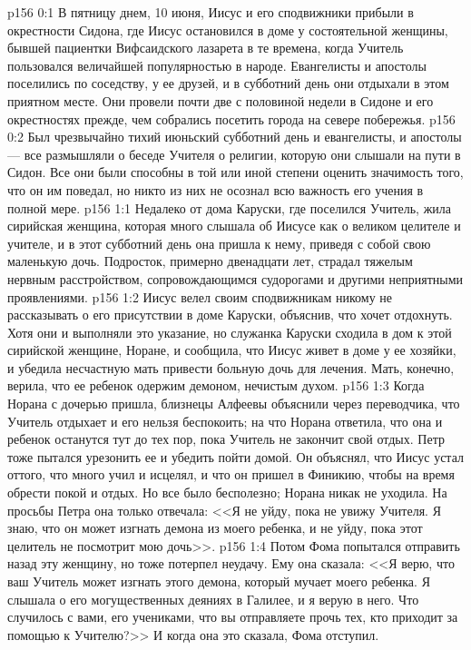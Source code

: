 \vs p156 0:1 В пятницу днем, 10 июня, Иисус и его сподвижники прибыли в окрестности Сидона, где Иисус остановился в доме у состоятельной женщины, бывшей пациентки Вифсаидского лазарета в те времена, когда Учитель пользовался величайшей популярностью в народе. Евангелисты и апостолы поселились по соседству, у ее друзей, и в субботний день они отдыхали в этом приятном месте. Они провели почти две с половиной недели в Сидоне и его окрестностях прежде, чем собрались посетить города на севере побережья.
\vs p156 0:2 Был чрезвычайно тихий июньский субботний день и евангелисты, и апостолы --- все размышляли о беседе Учителя о религии, которую они слышали на пути в Сидон. Все они были способны в той или иной степени оценить значимость того, что он им поведал, но никто из них не осознал всю важность его учения в полной мере.
\vs p156 1:1 Недалеко от дома Каруски, где поселился Учитель, жила сирийская женщина, которая много слышала об Иисусе как о великом целителе и учителе, и в этот субботний день она пришла к нему, приведя с собой свою маленькую дочь. Подросток, примерно двенадцати лет, страдал тяжелым нервным расстройством, сопровождающимся судорогами и другими неприятными проявлениями.
\vs p156 1:2 Иисус велел своим сподвижникам никому не рассказывать о его присутствии в доме Каруски, объяснив, что хочет отдохнуть. Хотя они и выполняли это указание, но служанка Каруски сходила в дом к этой сирийской женщине, Норане, и сообщила, что Иисус живет в доме у ее хозяйки, и убедила несчастную мать привести больную дочь для лечения. Мать, конечно, верила, что ее ребенок одержим демоном, нечистым духом.
\vs p156 1:3 Когда Норана с дочерью пришла, близнецы Алфеевы объяснили через переводчика, что Учитель отдыхает и его нельзя беспокоить; на что Норана ответила, что она и ребенок останутся тут до тех пор, пока Учитель не закончит свой отдых. Петр тоже пытался урезонить ее и убедить пойти домой. Он объяснял, что Иисус устал оттого, что много учил и исцелял, и что он пришел в Финикию, чтобы на время обрести покой и отдых. Но все было бесполезно; Норана никак не уходила. На просьбы Петра она только отвечала: <<Я не уйду, пока не увижу Учителя. Я знаю, что он может изгнать демона из моего ребенка, и не уйду, пока этот целитель не посмотрит мою дочь>>.
\vs p156 1:4 Потом Фома попытался отправить назад эту женщину, но тоже потерпел неудачу. Ему она сказала: <<Я верю, что ваш Учитель может изгнать этого демона, который мучает моего ребенка. Я слышала о его могущественных деяниях в Галилее, и я верую в него. Что случилось с вами, его учениками, что вы отправляете прочь тех, кто приходит за помощью к Учителю?>> И когда она это сказала, Фома отступил.
